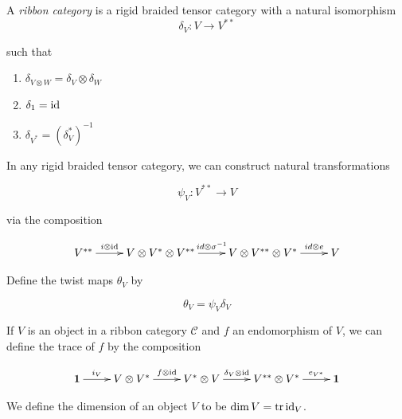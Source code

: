 \begin{defn}

    A \emph{ribbon category} is a rigid braided tensor category with a natural
    isomorphism
    \begin{equation}
        \delta_V: V \to V^{**}
    \end{equation}

such that 
\begin{enumerate}
    \renewcommand{\labelenumi}{\roman{enumi})}

    \item $\delta_{V \otimes W} = \delta_V \otimes \delta_W$
    \item $\delta_1 = \operatorname{id}$
    \item $\delta_{V^*} = (\delta_V^*)^{-1}$
\end{enumerate}

\end{defn}

In any rigid braided tensor category, we can construct natural transformations 

\begin{equation}
\psi_V: V^{**} \to V
\end{equation}

via the composition

\begin{equation}
\xymatrix{
    V^{**} \ar[r]^-{i \otimes \id} & V \otimes V^* \otimes V^{**} \ar[r]^-{id \otimes \sigma^{-1}} & V \otimes V^{**} \otimes V^* \ar[r]^-{id \otimes e} &  V
    }
\end{equation}

Define the twist maps $\theta_V$ by

\begin{equation}
\theta_V = \psi_V \delta_V
\end{equation}

If $V$ is an object in a ribbon category $\mathcal{C}$ and $f$ an endomorphism
of $V$, we can define the trace of $f$ by the composition

\begin{equation}
    \xymatrix{
    \one \ar[r]^-{i_V} & V \otimes V^* \ar[r]^-{f \otimes \id} & V^* \otimes V \ar[r]^-{\delta_V \otimes \id} & V^{**} \otimes V^* \ar[r]^-{e_{V^*}} & 
    \one
    }
\end{equation}

We define the dimension of an object $V$ to be $\dim V = \operatorname{tr} \operatorname{id}_V$.

